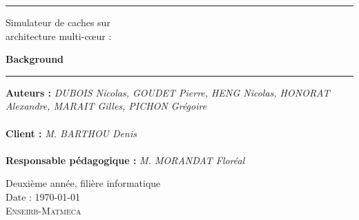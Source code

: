 \thispagestyle{empty}

\hrule
\begin{flushleft}
\huge{Simulateur de caches sur\\architecture multi-c\oe ur :}\\
\end{flushleft}
\begin{flushright}
\Huge\textbf{Background}\\
\end{flushright}
\hrule

\noindent\textbf{Auteurs :}
\emph{DUBOIS Nicolas, GOUDET Pierre, HENG Nicolas, HONORAT Alexandre, MARAIT Gilles, PICHON Grégoire}\\
\\
\noindent\textbf{Client :}
\emph{M. BARTHOU Denis}\\
\\
\noindent\textbf{Responsable pédagogique :}
\emph{M. MORANDAT Floréal} 

\normalsize
\begin{center}
  Deuxième année, filière informatique\\
  Date : \today\\
  \textsc{Enseirb-Matmeca}
\end{center}
